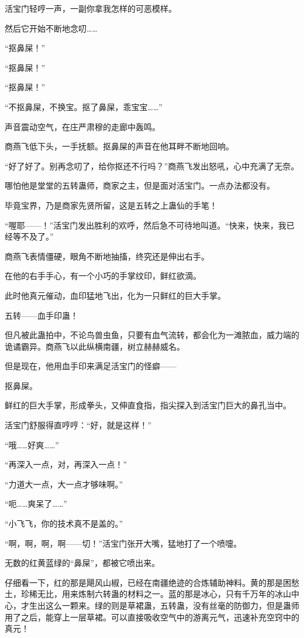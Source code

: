 \begin{this_body}
活宝门轻哼一声，一副你拿我怎样的可恶模样。

然后它开始不断地念叨……

“抠鼻屎！”

“抠鼻屎！”

“抠鼻屎！”

“不抠鼻屎，不换宝。抠了鼻屎，乖宝宝……”

声音震动空气，在庄严肃穆的走廊中轰鸣。

商燕飞低下头，一手抚额。抠鼻屎的声音在他耳畔不断地回响。

“好了好了。别再念叨了，给你抠还不行吗？”商燕飞发出怒吼，心中充满了无奈。

哪怕他是堂堂的五转蛊师，商家之主，但是面对活宝门。一点办法都没有。

毕竟宝界，乃是商家先贤所留，这是五转之上蛊仙的手笔！

“喔耶——！”活宝门发出胜利的欢呼，然后急不可待地叫道。“快来，快来，我已经等不及了。”

商燕飞表情僵硬，眼角不断地抽搐，终究还是伸出右手。

在他的右手手心，有一个小巧的手掌纹印，鲜红欲滴。

此时他真元催动，血印猛地飞出，化为一只鲜红的巨大手掌。

五转——血手印蛊！

但凡被此蛊拍中，不论鸟兽虫鱼，只要有血气流转，都会化为一滩脓血，威力端的诡谲霸异。商燕飞以此纵横南疆，树立赫赫威名。

但是现在，他用血手印来满足活宝门的怪癖——

抠鼻屎。

鲜红的巨大手掌，形成拳头，又伸直食指，指尖探入到活宝门巨大的鼻孔当中。

活宝门舒服得直哼哼：“好，就是这样！”

“哦……好爽……”

“再深入一点，对，再深入一点！”

“力道大一点，大一点才够味啊。”

“呃……爽呆了……”

“小飞飞，你的技术真不是盖的。”

“啊，啊，啊，啊——切！”活宝门张开大嘴，猛地打了一个喷嚏。

无数的红黄蓝绿的“鼻屎”，都被它喷出来。

仔细看一下，红的那是飓风山椒，已经在南疆绝迹的合炼辅助神料。黄的那是困愁土，珍稀无比，用来炼制六转蛊的材料之一。蓝的那是冰心，只有千万年的冰山中心，才生出这么一颗来。绿的则是草裙蛊，五转蛊，没有丝毫的防御力，但是蛊师用了之后，能穿上一层草裙。可以直接吸收空气中的游离元气，迅速补充空窍中的真元！


\end{this_body}
